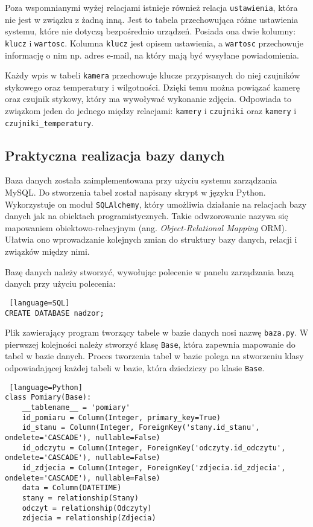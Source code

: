 \documentclass[a4paper,11pt,twoside]{article}
\begin{document}
Poza wspomnianymi wyżej relacjami istnieje również relacja \texttt{ustawienia}, która nie jest w związku z żadną inną. Jest to tabela przechowująca różne ustawienia systemu, które nie dotyczą bezpośrednio urządzeń. Posiada ona dwie kolumny: \texttt{klucz} i \texttt{wartosc}. Kolumna \texttt{klucz} jest opisem ustawienia, a \texttt{wartosc} przechowuje informację o nim np. adres e-mail, na który mają być wysyłane powiadomienia. 

Każdy wpis w tabeli \texttt{kamera} przechowuje klucze przypisanych do niej czujników stykowego oraz temperatury i wilgotności. Dzięki temu można powiązać kamerę oraz czujnik stykowy, który ma wywoływać wykonanie zdjęcia. Odpowiada to związkom jeden do jednego między relacjami: \texttt{kamery} i \texttt{czujniki} oraz \texttt{kamery} i \texttt{czujniki{\_}temperatury}.

\subsection{Praktyczna realizacja bazy danych}
Baza danych została zaimplementowana przy użyciu systemu zarządzania MySQL. Do stworzenia tabel został napisany skrypt w języku Python. Wykorzystuje on moduł \texttt{SQLAlchemy}, który umożliwia działanie na relacjach bazy danych jak na obiektach programistycznych. Takie odwzorowanie nazywa się mapowaniem obiektowo-relacyjnym (ang. \textit{Object-Relational Mapping} ORM). Ułatwia ono wprowadzanie kolejnych zmian do struktury bazy danych, relacji i związków między nimi.

Bazę danych należy stworzyć, wywołując polecenie w panelu zarządzania bazą danych przy użyciu polecenia:
\begin{lstlisting} [language=SQL]
CREATE DATABASE nadzor;
\end{lstlisting}
Plik zawierający program tworzący tabele w bazie danych nosi nazwę \texttt{baza.py}. W pierwszej kolejności należy stworzyć klasę \texttt{Base}, która zapewnia mapowanie do tabel w bazie danych. Proces tworzenia tabel w bazie polega na stworzeniu klasy odpowiadającej każdej tabeli w bazie, która dziedziczy po klasie \texttt{Base}\cite{sqlalchemy-base}.
\begin{lstlisting} [language=Python]
class Pomiary(Base):
    __tablename__ = 'pomiary'
    id_pomiaru = Column(Integer, primary_key=True)
    id_stanu = Column(Integer, ForeignKey('stany.id_stanu', ondelete='CASCADE'), nullable=False)
    id_odczytu = Column(Integer, ForeignKey('odczyty.id_odczytu', ondelete='CASCADE'), nullable=False)
    id_zdjecia = Column(Integer, ForeignKey('zdjecia.id_zdjecia', ondelete='CASCADE'), nullable=False)
    data = Column(DATETIME)
    stany = relationship(Stany)
    odczyt = relationship(Odczyty)
    zdjecia = relationship(Zdjecia)
\end{lstlisting}
\end{document}

